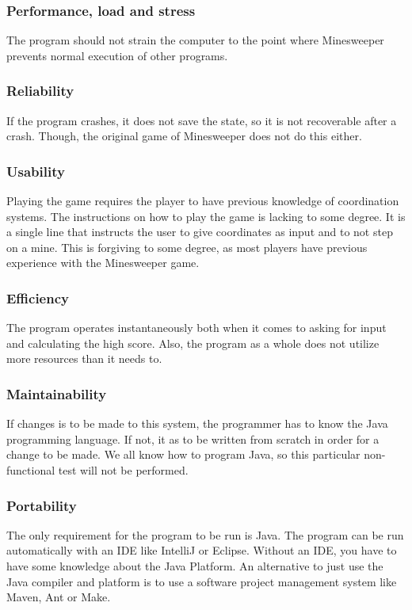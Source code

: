 \documentclass[UKenglish]{article}  %
\begin{document}
\subsubsection{Performance, load and stress}
The program should not strain the computer to the point where Minesweeper
prevents normal execution of other programs. 

\subsubsection{Reliability}
If the program crashes, it does not save the state, so it is not recoverable
after a crash. Though, the original game of Minesweeper does not do this either.

\subsubsection{Usability}
Playing the game requires the player to have previous knowledge of coordination
systems. The instructions on how to play the game is lacking to some degree. It
is a single line that instructs the user to give coordinates as input and to not
step on a mine. This is forgiving to some degree, as most players have previous
experience with the Minesweeper game.

\subsubsection{Efficiency}
The program operates instantaneously both when it comes to asking for input and
calculating the high score. Also, the program as a whole does not utilize
more resources than it needs to.

\subsubsection{Maintainability}
If changes is to be made to this system, the programmer has to know the Java
programming language. If not, it as to be written from scratch in order for a
change to be made. We all know how to program Java, so this particular
non-functional test will not be performed.

\subsubsection{Portability}
The only requirement for the program to be run is Java. The program can be run
automatically with an IDE like IntelliJ or Eclipse. Without an IDE, you have to
have some knowledge about the Java Platform. An alternative to just use the Java
compiler and platform is to use a software project management system like Maven,
Ant or Make.
\end{document}
